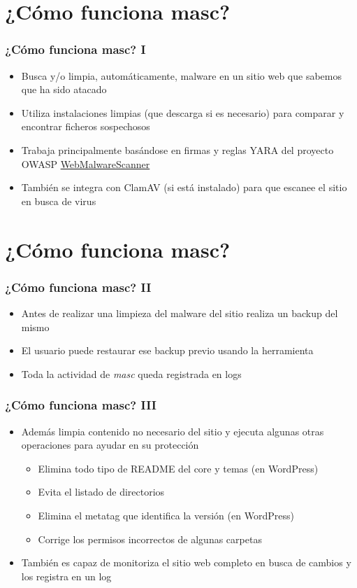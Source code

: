\documentclass[xcolor={dvipsnames}]{beamer}
\begin{document}
\section{¿Cómo funciona masc?}
\begin{frame}\frametitle{¿Cómo funciona masc? I}

    \begin{itemize}
        \item Busca y/o limpia, automáticamente, malware en un sitio web que sabemos que ha sido atacado
        \item Utiliza instalaciones limpias (que descarga si es necesario) para comparar y encontrar ficheros sospechosos
        \item Trabaja principalmente basándose en firmas y reglas YARA del proyecto OWASP \href{https://wiki.owasp.org/index.php/OWASP_Web_Malware_Scanner_Project}{WebMalwareScanner}
        \item También se integra con ClamAV (si está instalado) para que escanee el sitio en busca de virus
    \end{itemize}
\end{frame}

\section{¿Cómo funciona masc?}
\begin{frame}\frametitle{¿Cómo funciona masc? II}

    \begin{itemize}
        \item Antes de realizar una limpieza del malware del sitio realiza un backup del mismo
        \item El usuario puede restaurar ese backup previo usando la herramienta
        \item Toda la actividad de \emph{masc} queda registrada en logs
    \end{itemize}
\end{frame}

\begin{frame}\frametitle{¿Cómo funciona masc? III}

    \begin{itemize}
        \item Además limpia contenido no necesario del sitio y ejecuta algunas otras operaciones para ayudar en su protección
            \begin{itemize}
                \item Elimina todo tipo de README del core y temas (en WordPress)
                \item Evita el listado de directorios
                \item Elimina el metatag que identifica la versión (en WordPress)
                \item Corrige los permisos incorrectos de algunas carpetas
            \end{itemize}
        \item También es capaz de monitoriza el sitio web completo en busca de cambios y los registra en un log
    \end{itemize}
\end{frame}
\end{document}
